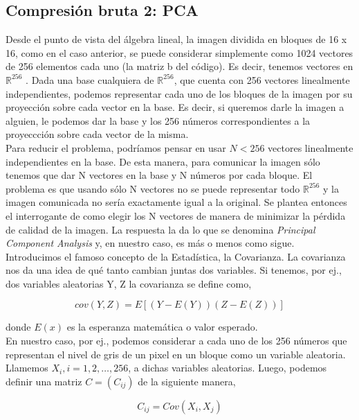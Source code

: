 \documentclass[twocolumn,a4paper,10pt]{article}
\begin{document}
\subsection{Compresi\'on bruta 2: PCA}

Desde el punto de vista del  \'algebra lineal, la imagen dividida en bloques de 16 x 16, como en el caso anterior, se puede considerar simplemente como
1024 vectores de 256 elementos cada uno (la matriz b del código). Es decir, tenemos vectores en $\mathbb{R}^{256}$ . Dada una base cualquiera de $\mathbb{R}^{256}$,
 que cuenta con 256 vectores linealmente independientes, podemos representar cada uno de los bloques de la imagen por su proyecci\'on sobre cada vector en la base. 
Es decir, si queremos darle la imagen a alguien, le podemos dar la base y los 256 n\'umeros correspondientes a la proyeccci\'on sobre cada vector de la misma. \\

Para reducir el problema, podríamos pensar en usar $N < 256$ vectores linealmente independientes en la base. De esta manera, para comunicar la imagen s\'olo
tenemos que dar N vectores en la base y N n\'umeros por cada bloque. El problema es que usando s\'olo N vectores no se puede representar todo $\mathbb{R}^{256}$ y la 
imagen comunicada no ser\'ia exactamente igual a la original. Se plantea entonces el interrogante de como elegir los N vectores de manera de minimizar la p\'erdida 
de calidad de la imagen. La respuesta la da lo que se denomina \textit{Principal Component Analysis} y, en nuestro caso, es m\'as o menos como sigue.\\

Introducimos el famoso concepto de la Estadística, la Covarianza. La covarianza nos da una idea de qu\'e tanto cambian juntas dos variables. Si tenemos, por ej., 
dos variables aleatorias Y, Z la covarianza se define como,

\[ cov(Y, Z) = E [(Y - E(Y )) (Z - E(Z))] \]

donde $E(x)$ es la esperanza matem\'atica o valor esperado. \\

En nuestro caso, por ej., podemos considerar a cada uno de los 256 n\'umeros que representan el nivel de gris de un pixel en un bloque como un variable aleatoria.
Llamemos $X_{i}, i = 1, 2, \dotsc, 256$, a dichas variables aleatorias. Luego, podemos definir una matriz $C = (C_{ij} )$ de la siguiente manera,

\[C_{ij} = Cov(X_{i}, X_{j})  \]
\end{document}
